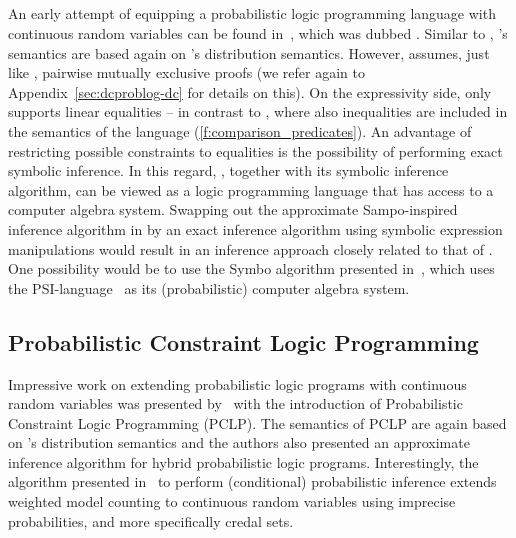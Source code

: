 \subsection{\extendedprismsty}

An early attempt of equipping a probabilistic logic programming language with continuous random variables can be found in~\citep{islam2012inference}, which was dubbed {\em \extendedprismsty}. 
Similar to \dcproblogsty, \extendedprismsty's semantics are based again on \citeauthor{sato1995statistical}'s distribution semantics.
However, \extendedprismsty assumes, just like \dcsty , pairwise mutually exclusive proofs (we refer again to Appendix~\ref{sec:dcproblog-dc} for details on this).
On the expressivity side, \extendedprismsty only supports linear equalities -- in contrast to \dcproblogsty, where also inequalities are included in the semantics of the language (\ref{f:comparison_predicates}). 
An advantage of restricting possible constraints to equalities is the possibility of performing exact symbolic inference. In this regard, \extendedprismsty, together with its symbolic inference algorithm, can be viewed as a logic programming language that has access to a computer algebra system. Swapping out the approximate Sampo-inspired inference algorithm in \dcproblogsty by an exact inference algorithm using symbolic expression manipulations would result in an inference approach closely related to that of \extendedprismsty. One possibility would be to use the Symbo algorithm presented in~\citep{zuidbergdosmartires2019exact}, which uses the PSI-language~\citep{gehr2016psi} as its (probabilistic)  computer algebra system.




\subsection{Probabilistic Constraint Logic Programming}

Impressive work on extending probabilistic logic programs with continuous random variables was presented by~\citet{michels2015new} with the introduction of Probabilistic Constraint Logic Programming (PCLP). The semantics of PCLP are again based on \citeauthor{sato1995statistical}'s distribution semantics and the authors also presented an approximate inference algorithm for hybrid probabilistic logic programs.
Interestingly, the algorithm presented in~\citep{michels2015new} to perform (conditional) probabilistic inference extends weighted model counting to continuous random variables using imprecise probabilities, and more specifically credal sets.

